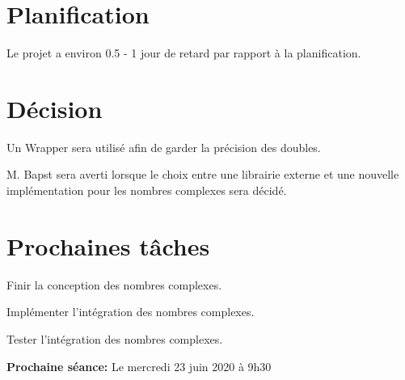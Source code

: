 \documentclass[11pt]{meetingmins}
\begin{document}
\section{Planification}
\begin{hiddenitems}
    \item Le projet a environ 0.5 - 1 jour de retard par rapport à la planification.
\end{hiddenitems}

\section{Décision}
\begin{hiddenitems}
    \item Un Wrapper sera utilisé afin de garder la précision des doubles.
    \item M. Bapst sera averti lorsque le choix entre une librairie externe et une nouvelle implémentation pour les nombres complexes sera décidé.
\end{hiddenitems}

\section{Prochaines tâches}
\begin{hiddenitems}
    \item Finir la conception des nombres complexes.
    \item Implémenter l'intégration des nombres complexes.
    \item Tester l'intégration des nombres complexes.
\end{hiddenitems}

\vspace{1em}
\par \noindent \textbf {Prochaine séance:} Le mercredi 23 juin 2020 à 9h30
\end{document}
